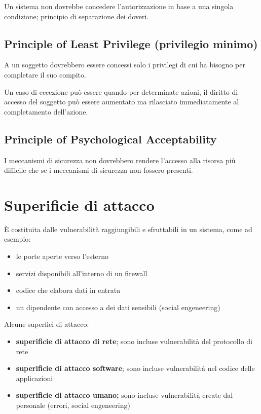 Un sistema non dovrebbe concedere l'autorizzazione in base a una singola condizione;
principio di separazione dei doveri.

\subsection{Principle of Least Privilege (privilegio minimo)}

A un soggetto dovrebbero essere concessi solo i privilegi di cui ha bisogno per completare il suo
compito.

Un caso di eccezione può essere quando per determinate azioni, il diritto di accesso del soggetto può essere
aumentato ma rilasciato immediatamente al completamento dell'azione.

\subsection{Principle of Psychological Acceptability}

I meccanismi di sicurezza non dovrebbero rendere l'accesso alla risorsa più difficile che se i
meccanismi di sicurezza non fossero presenti.

\section{Superificie di attacco}
È costituita dalle vulnerabilità raggiungibili e sfruttabili in un sistema, come ad esempio:
\begin{itemize}
    \item le porte aperte verso l'esterno
    \item servizi disponibili all'interno di un firewall
    \item codice che elabora dati in entrata
    \item un dipendente con accesso a dei dati sensibili (social engeneering)
\end{itemize}

Alcune superfici di attacco:
\begin{itemize}
    \item \textbf{superificie di attacco di rete}; sono incluse vulnerabilità del protocollo di rete
    \item \textbf{superificie di attacco software}; sono incluse vulnerabilità nel codice delle applicazioni
    \item \textbf{superificie di attacco umano;} sono incluse vulnerabilità create dal personale (errori, social engeneering)
\end{itemize}


